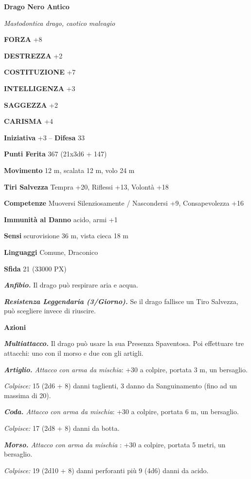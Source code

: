 \begin{multicols}{2}
	\medskip{}\textbf{Drago Nero Antico}

	\textit{Mastodontica drago, caotico malvagio}

	\textbf{FORZA} +8

	\textbf{DESTREZZA} +2

	\textbf{COSTITUZIONE} +7

	\textbf{INTELLIGENZA} +3

	\textbf{SAGGEZZA} +2

	\textbf{CARISMA} +4

	\textbf{Iniziativa} +3 -- \textbf{Difesa} 33

	\textbf{Punti Ferita} 367 (21x3d6 + 147)

	\textbf{Movimento} 12 m, scalata 12 m, volo 24 m

	\textbf{Tiri Salvezza} Tempra +20, Riflessi +13, Volontà +18

	\textbf{Competenze} Muoversi Silenziosamente / Nascondersi +9, Consapevolezza +16

	\textbf{Immunità al Danno} acido, armi +1

	\textbf{Sensi} scurovisione 36 m, vista cieca 18 m

	\textbf{Linguaggi} Comune, Draconico

	\textbf{Sfida} 21 (33000 PX)

	\textit{\textbf{Anfibio.}} Il drago può respirare aria e acqua.

	\textit{\textbf{Resistenza Leggendaria (3/Giorno).}} Se il drago fallisce un Tiro Salvezza, può scegliere invece di riuscire.

	\textbf{Azioni}

	\textit{\textbf{Multiattacco.}} Il drago può usare la sua Presenza Spaventosa. Poi effettuare tre attacchi: uno con il morso e due con gli artigli.

	\textit{\textbf{Artiglio.} Attacco con arma da mischia}: +30 a colpire, portata 3 m, un bersaglio.

	\textit{Colpisce:} 15 (2d6 + 8) danni taglienti, 3 danno da Sanguinamento (fino ad un massima di 20).

	\textit{\textbf{Coda.} Attacco con arma da mischia}: +30 a colpire, portata 6 m, un bersaglio.

	\textit{Colpisce:} 17 (2d8 + 8) danni da botta.

	\textit{\textbf{Morso.} Attacco con arma da mischia} : +30 a colpire, portata 5 metri, un bersaglio.

	\textit{Colpisce:} 19 (2d10 + 8) danni perforanti più 9 (4d6) danni da acido.


\end{multicols}
